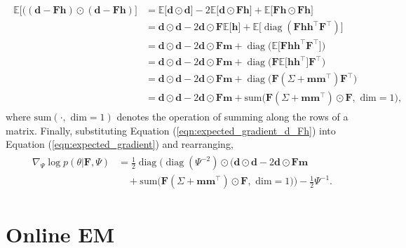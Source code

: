 \documentclass[msc,deptreport.inf]{infthesis} %
\newcommand{\matr}[1]{\mathbf{#1}}
\newcommand{\E}{\mathbb E}
\newcommand{\diag}{\mathop{\mathrm{diag}}}
\begin{document}
\begin{align}\label{eqn:expected_gradient_d_Fh}
\begin{split}
	\E \big[\big((\matr{d} - \matr{Fh}) \odot (\matr{d} - \matr{Fh})\big] 
	& = \E \big[\matr{d} \odot \matr{d} \big] - 2\E \big[ \matr{d} \odot \matr{Fh} \big] + \E \big[ \matr{Fh} \odot \matr{Fh} \big] \\
	& = \matr{d} \odot \matr{d} - 2\matr{d} \odot \matr{F} \E \big[ \matr{h} \big] + \E \big[ \diag(\matr{Fhh^\intercal F^\intercal}) \big] \\
	& = \matr{d} \odot \matr{d} - 2\matr{d} \odot \matr{F} \matr{m} + \diag\big(\E \big[ \matr{Fhh^\intercal F^\intercal} \big]\big) \\
	& = \matr{d} \odot \matr{d} - 2\matr{d} \odot \matr{F} \matr{m} + \diag\big( \matr{F} \E \big[ \matr{hh^\intercal} \big] \matr{F}^\intercal \big) \\
	& = \matr{d} \odot \matr{d} - 2\matr{d} \odot \matr{F} \matr{m} + \diag\big( \matr{F} (\Sigma + \matr{m} \matr{m}^\intercal) \matr{F}^\intercal \big) \\
	& = \matr{d} \odot \matr{d} - 2\matr{d} \odot \matr{F} \matr{m} + \text{sum}\big(\matr{F} (\Sigma + \matr{m} \matr{m}^\intercal) \odot \matr{F}, \text{ dim} = 1\big),
\end{split}
\end{align} 
where $\text{sum}(\cdot, \text{ dim} = 1)$ denotes the operation of summing along the rows of a matrix. Finally, substituting Equation (\ref{eqn:expected_gradient_d_Fh}) into Equation (\ref{eqn:expected_gradient}) and rearranging, 
\begin{align}
\begin{split}
	\nabla_{\Psi} \log p(\theta | \matr{F}, \Psi) 
	& = \frac{1}{2} \diag\Big(\diag(\Psi^{-2}) \odot \big(\matr{d} \odot \matr{d} - 2\matr{d} \odot \matr{F} \matr{m} \\
	& \quad + \text{sum}\big(\matr{F} (\Sigma + \matr{m} \matr{m}^\intercal) \odot \matr{F}, \text{ dim} = 1\big) \Big)
	 - \frac{1}{2} \Psi^{-1}.
\end{split}
\end{align} 


\section{Online EM}\label{sec:online_em}
\end{document}
